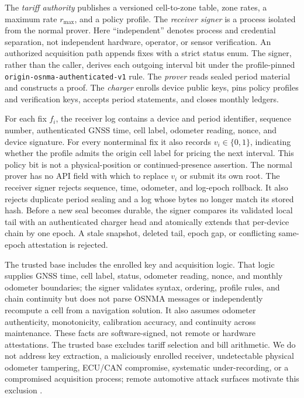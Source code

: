 \documentclass[conference]{IEEEtran}
\theoremstyle{plain}
\theoremstyle{definition}
\newcommand{\rmax}{r_{\max}}
\begin{document}
The \emph{tariff authority} publishes a versioned cell-to-zone table, zone
rates, a maximum rate $\rmax$, and a policy profile. The \emph{receiver signer}
is a process isolated from the normal prover. Here ``independent'' denotes
process and credential separation, not independent hardware, operator, or
sensor verification. An authorized acquisition path
appends fixes with a strict status enum. The signer, rather than the caller,
derives each outgoing interval bit under the profile-pinned
\texttt{origin-osnma-authenticated-v1} rule. The
\emph{prover} reads sealed period material and constructs a proof. The
\emph{charger} enrolls device public keys, pins policy profiles and verification
keys, accepts period statements, and closes monthly ledgers.

For each fix $f_i$, the receiver log contains a device and period identifier,
sequence number, authenticated GNSS time, cell label, odometer reading, nonce,
and device signature. For every nonterminal fix it also records
$v_i\in\{0,1\}$, indicating whether the profile admits the origin cell label for
pricing the next interval. This policy bit is not a physical-position or
continued-presence assertion. The normal prover has no API field with which to replace
$v_i$ or submit its own root. The receiver signer rejects sequence, time,
odometer, and log-epoch rollback. It also rejects duplicate period sealing and a log whose
bytes no longer match its stored hash. Before a new seal becomes durable, the
signer compares its validated local tail with an authenticated charger head and
atomically extends that per-device chain by one epoch. A stale snapshot, deleted
tail, epoch gap, or conflicting same-epoch attestation is rejected.

The trusted base includes the enrolled key and acquisition logic. That logic
supplies GNSS time, cell label, status, odometer reading, nonce, and monthly
odometer boundaries; the signer validates syntax, ordering, profile rules, and
chain continuity but does not parse OSNMA messages or independently recompute a
cell from a navigation solution. It also assumes odometer authenticity,
monotonicity, calibration accuracy, and continuity across maintenance. These
facts are software-signed, not remote or hardware attestations. The trusted
base excludes tariff selection and bill arithmetic. We do not address key
extraction, a maliciously enrolled receiver, undetectable physical odometer
tampering, ECU/CAN compromise, systematic under-recording, or a compromised
acquisition process; remote automotive attack surfaces motivate this exclusion
\cite{Checkoway2011Automotive}.
\end{document}
